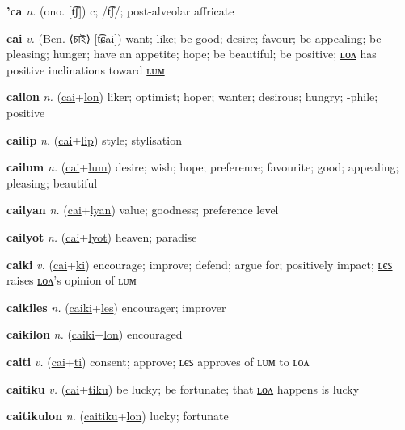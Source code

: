 \textbf{\hypertarget{'ca}{'ca}} \textit{n.} (ono. [t͡ʃ])
c; /t͡ʃ/; post-alveolar affricate

\textbf{\hypertarget{cai}{cai}} \textit{v.} (Ben. ⟨{\bengali{}চাই}⟩ [t͡ɕai])
want; like; be good; desire; favour; be appealing; be pleasing; hunger; have an appetite; hope; be beautiful; be positive; \hyperlink{cailon}{ʟᴏᴧ} has positive inclinations toward \hyperlink{cailum}{ʟᴜᴍ}

\textbf{\hypertarget{cailon}{cailon}} \textit{n.} (\hyperlink{cai}{cai}+\allowbreak \hyperlink{lon}{lon})
liker; optimist; hoper; wanter; desirous; hungry; -phile; positive

\textbf{\hypertarget{cailip}{cailip}} \textit{n.} (\hyperlink{cai}{cai}+\allowbreak \hyperlink{lip}{lip})
style; stylisation

\textbf{\hypertarget{cailum}{cailum}} \textit{n.} (\hyperlink{cai}{cai}+\allowbreak \hyperlink{lum}{lum})
desire; wish; hope; preference; favourite; good; appealing; pleasing; beautiful

\textbf{\hypertarget{cailyan}{cailyan}} \textit{n.} (\hyperlink{cai}{cai}+\allowbreak \hyperlink{lyan}{lyan})
value; goodness; preference level

\textbf{\hypertarget{cailyot}{cailyot}} \textit{n.} (\hyperlink{cai}{cai}+\allowbreak \hyperlink{lyot}{lyot})
heaven; paradise

\textbf{\hypertarget{caiki}{caiki}} \textit{v.} (\hyperlink{cai}{cai}+\allowbreak \hyperlink{ki}{ki})
encourage; improve; defend; argue for; positively impact; \hyperlink{caikiles}{ʟєꜱ} raises \hyperlink{caikilon}{ʟᴏᴧ}’s opinion of ʟᴜᴍ

\textbf{\hypertarget{caikiles}{caikiles}} \textit{n.} (\hyperlink{caiki}{caiki}+\allowbreak \hyperlink{les}{les})
encourager; improver

\textbf{\hypertarget{caikilon}{caikilon}} \textit{n.} (\hyperlink{caiki}{caiki}+\allowbreak \hyperlink{lon}{lon})
encouraged

\textbf{\hypertarget{caiti}{caiti}} \textit{v.} (\hyperlink{cai}{cai}+\allowbreak \hyperlink{ti}{ti})
consent; approve; ʟєꜱ approves of ʟᴜᴍ to ʟᴏᴧ

\textbf{\hypertarget{caitiku}{caitiku}} \textit{v.} (\hyperlink{cai}{cai}+\allowbreak \hyperlink{tiku}{tiku})
be lucky; be fortunate; that \hyperlink{caitikulon}{ʟᴏᴧ} happens is lucky

\textbf{\hypertarget{caitikulon}{caitikulon}} \textit{n.} (\hyperlink{caitiku}{caitiku}+\allowbreak \hyperlink{lon}{lon})
lucky; fortunate


